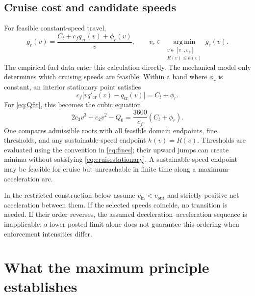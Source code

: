 \documentclass[10pt,a4paper]{article}
\newcommand{\argmin}{\operatorname*{arg\,min}}
\newcommand{\out}{\mathrm{out}}
\newcommand{\inn}{\mathrm{in}}
\newcommand{\cruise}{\mathrm{cr}}
\begin{document}
\subsection{Cruise cost and candidate speeds}
For feasible constant-speed travel,
\begin{equation}
g_r(v)=\frac{C_t+c_fq_{\cruise}(v)+\phi_r(v)}{v},\qquad
v_r\in\argmin_{\substack{v\in[v_-,v_+]\\R(v)\le h(v)}}g_r(v).
\label{eq:g}
\end{equation}
The empirical fuel data enter this calculation directly. The mechanical model only determines which cruising speeds are feasible. Within a band where $\phi_r$ is constant, an interior stationary point satisfies
\begin{equation}
c_f\bigl[vq'_{\cruise}(v)-q_{\cruise}(v)\bigr]=C_t+\phi_r.
\label{eq:cruisestationary}
\end{equation}
For \eqref{eq:Qfit}, this becomes the cubic equation
\begin{equation}
2c_3v^3+c_2v^2-Q_0=\frac{3600}{c_f}(C_t+\phi_r).
\label{eq:cubic}
\end{equation}
One compares admissible roots with all feasible domain endpoints, fine thresholds, and any sustainable-speed endpoint $h(v)=R(v)$. Thresholds are evaluated using the convention in \eqref{eq:fines}; their upward jumps can create minima without satisfying \eqref{eq:cruisestationary}. A sustainable-speed endpoint may be feasible for cruise but unreachable in finite time along a maximum-acceleration arc.

In the restricted construction below assume $v_{\inn}<v_{\out}$ and strictly positive net acceleration between them. If the selected speeds coincide, no transition is needed. If their order reverses, the assumed deceleration--acceleration sequence is inapplicable; a lower posted limit alone does not guarantee this ordering when enforcement intensities differ.

\section{What the maximum principle establishes}
\label{sec:pmp}
\end{document}
